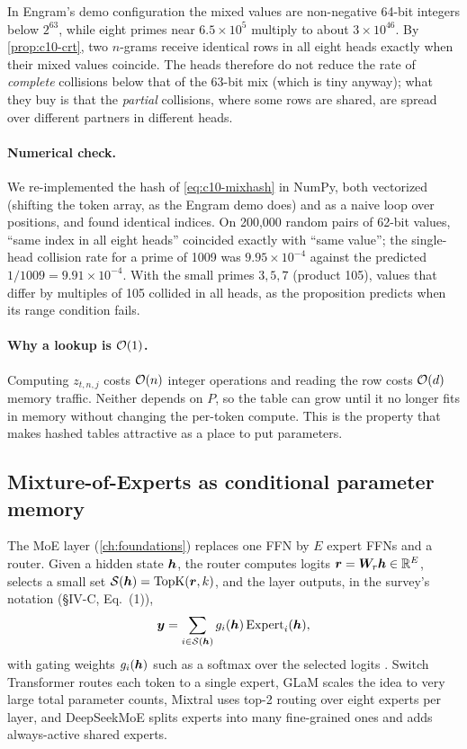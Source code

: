 In Engram's demo configuration the mixed values are non-negative 64-bit integers below $2^{63}$,
while eight primes near $6.5 \times 10^5$ multiply to about $3 \times 10^{46}$. By
\cref{prop:c10-crt}, two $n$-grams receive identical rows in all eight heads exactly when their
mixed values coincide. The heads therefore do not reduce the rate of \emph{complete} collisions
below that of the 63-bit mix (which is tiny anyway); what they buy is that the \emph{partial}
collisions, where some rows are shared, are spread over different partners in different heads.

\paragraph{Numerical check.} We re-implemented the hash of \cref{eq:c10-mixhash} in NumPy, both
vectorized (shifting the token array, as the Engram demo does) and as a naive loop over positions,
and found identical indices. On 200{,}000 random pairs of 62-bit values, ``same index in all eight
heads'' coincided exactly with ``same value''; the single-head collision rate for a prime of 1009
was $9.95 \times 10^{-4}$ against the predicted $1/1009 = 9.91 \times 10^{-4}$. With the small
primes $3, 5, 7$ (product 105), values that differ by multiples of 105 collided in all heads, as
the proposition predicts when its range condition fails.

\paragraph{Why a lookup is $\mathcal{O}(1)$.} Computing $z_{t,n,j}$ costs $\mathcal{O}(n)$ integer operations
and reading the row costs $\mathcal{O}(d)$ memory traffic. Neither depends on $P$, so the table can grow
until it no longer fits in memory without changing the per-token compute. This is the property
that makes hashed tables attractive as a place to put parameters.

\subsection{Mixture-of-Experts as conditional parameter memory}\label{sec:c10-moe}

The MoE layer (\cref{ch:foundations}) replaces one FFN by $E$ expert FFNs and a router. Given a
hidden state $\bm{h}$, the router computes logits $\bm{r} = \bm{W}_r \bm{h} \in \mathbb{R}^{E}$, selects a small set
$\mathcal{S}(\bm{h}) = \operatorname{TopK}(\bm{r}, k)$, and the layer outputs, in the survey's notation
(\S IV-C, Eq.~(1)),
\begin{equation}
  \bm{y} = \sum_{i \in \mathcal{S}(\bm{h})} g_i(\bm{h})\, \mathrm{Expert}_i(\bm{h}),
  \label{eq:c10-moe}
\end{equation}
with gating weights $g_i(\bm{h})$ such as a softmax over the selected logits
\citep{c01-shazeer2017moe}. Switch Transformer \citep{fedus2022switch} routes each token to a
single expert, GLaM \citep{du2022glam} scales the idea to very large total parameter counts,
Mixtral \citep{jiang2024mixtral} uses top-2 routing over eight experts per layer, and DeepSeekMoE
\citep{dai2024deepseekmoe} splits experts into many fine-grained ones and adds always-active shared
experts.

